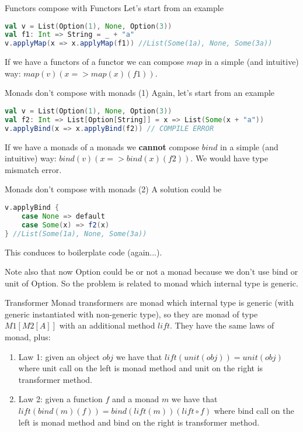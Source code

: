 \begin{frame}[fragile]{Functors compose with Functors}
	Let's start from an example
\begin{lstlisting}[language=scala]
val v = List(Option(1), None, Option(3))
val f1: Int => String = _ + "a"
v.applyMap(x => x.applyMap(f1)) //List(Some(1a), None, Some(3a))
\end{lstlisting}
	If we have a functors of a functor we can compose $map$ in a simple (and intuitive) way: $map(v)(x => map(x)(f1))$.
\end{frame}

\begin{frame}[fragile]{Monads don't compose with monads (1)}
	Again, let's start from an example
\begin{lstlisting}[language=scala]
val v = List(Option(1), None, Option(3))
val f2: Int => List[Option[String]] = x => List(Some(x + "a"))
v.applyBind(x => x.applyBind(f2)) // COMPILE ERROR
\end{lstlisting}
	If we have a monads of a monads we \textbf{cannot} compose $bind$ in a simple (and intuitive) way: $bind(v)(x => bind(x)(f2))$.
	We would have type mismatch error. 	
\end{frame}

\begin{frame}[fragile]{Monads don't compose with monads (2)}	
	A solution could be
\begin{lstlisting}[language=scala]
v.applyBind {
	case None => default
	case Some(x) => f2(x)
} //List(Some(1a), None, Some(3a))
\end{lstlisting}	
	This conduces to boilerplate code (again...).

	Note also that now Option could be or not a monad because we don't use bind or unit of Option. 
	So the problem is related to monad which internal type is generic.
\end{frame}

\begin{frame}[fragile]{Transformer}
	Monad transformers are monad which internal type is generic (with generic instantiated with non-generic type), 
	so they are monad of type $M1[M2[A]]$ with an additional method $lift$.
	\pause 
	They have the same laws of monad, plus:
	\begin{enumerate}[<+->]
		\item Law 1: given an object $obj$ we have that $lift(unit(obj)) = unit(obj)$ where unit call on the left is monad method and
		unit on the right is transformer method.
		\item Law 2: given a function $f$ and a monad $m$ we have that $lift(bind(m)(f)) = bind(lift(m))(lift \circ f)$ where
		bind call on the left is monad method and
		bind on the right is transformer method.
	\end{enumerate}
\end{frame}

